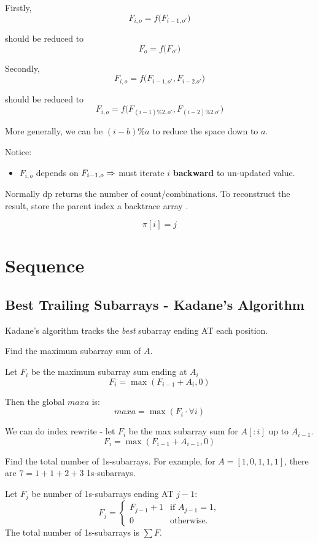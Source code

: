 Firstly,
$$
F_{i, o} = f\big(F_{i-1, o'}\big)
$$

should be reduced to 
$$
F_{o} = f\big(F_{o'}\big)
$$

Secondly,
$$
F_{i, o} = f\big(F_{i-1, o'}, F_{i-2. o'}\big)
$$

should be reduced to 
$$
F_{i, o} = f\big(F_{(i-1)\%2, o'}, F_{(i-2)\%2. o'}\big)
$$

More generally, we can be $(i-b)\%a$ to reduce the space down to $a$.

Notice:
\begin{itemize}
\item $F_{i, o}$ depends on $F_{i-1, o} \Rightarrow$ must iterate $i$ \textbf{backward} to un-updated value. 
\end{itemize}

 Normally dp returns the number of count/combinations. To reconstruct the result, store the parent index a backtrace array . 

$$
\pi[i]=j
$$


\section{Sequence}\label{dpSequence}
\subsection{Best Trailing Subarrays - Kadane's Algorithm}
Kadane’s algorithm tracks the \textit{best} subarray ending AT each position.

 Find the maximum subarray sum of $A$.  

Let $F_i$  be the maximum subarray sum ending at $A_{i}$
$$
F_i = \max(F_{i-1}+A_{i}, 0)
$$

Then the global $maxa$ is:
$$
maxa = \max(F_i\cdot \forall i)
$$

We can do index rewrite - let $F_i$ be the max subarray sum for $A[:i]$ up to $A_{i-1}$.
$$
F_i = \max(F_{i-1}+A_{i-1}, 0)
$$

 Find the total number of 1s-subarrays. For example, for $A = [1, 0, 1, 1, 1]$, there are $7=1+1+2+3$ 1s-subarrays. 

Let $F_j$ be number of 1s-subarrays ending AT $j-1$:
\[
F_j = 
\begin{cases}
   F_{j-1} + 1 & \text{if } A_{j-1} = 1, \\
   0 & \text{otherwise}.
\end{cases}
\]
The total number of 1s-subarrays is $\sum{F}$.

